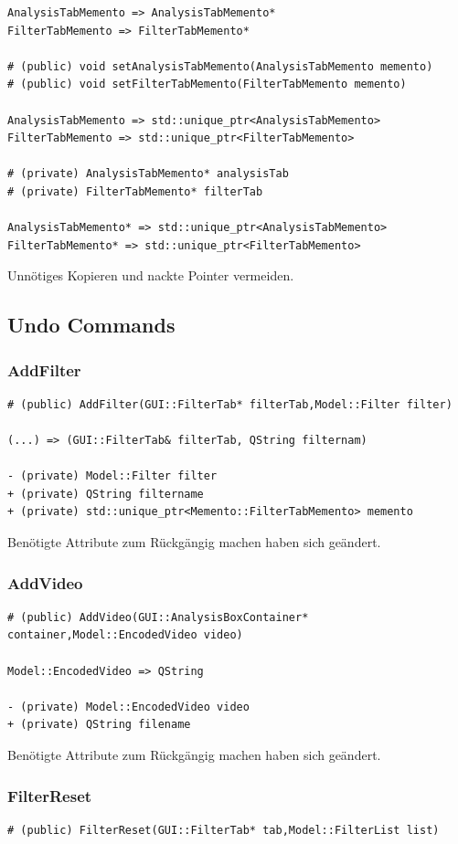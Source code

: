 \documentclass{scrartcl}
\begin{document}
{\begin{verbatim}
AnalysisTabMemento => AnalysisTabMemento*
FilterTabMemento => FilterTabMemento*

# (public) void setAnalysisTabMemento(AnalysisTabMemento memento)
# (public) void setFilterTabMemento(FilterTabMemento memento)

AnalysisTabMemento => std::unique_ptr<AnalysisTabMemento>
FilterTabMemento => std::unique_ptr<FilterTabMemento>

# (private) AnalysisTabMemento* analysisTab
# (private) FilterTabMemento* filterTab

AnalysisTabMemento* => std::unique_ptr<AnalysisTabMemento>
FilterTabMemento* => std::unique_ptr<FilterTabMemento>
\end{verbatim}
Unnötiges Kopieren und nackte Pointer vermeiden.
\newpage
\subsection{Undo Commands}
\subsubsection{AddFilter}
\begin{verbatim}
# (public) AddFilter(GUI::FilterTab* filterTab,Model::Filter filter)

(...) => (GUI::FilterTab& filterTab, QString filternam)

- (private) Model::Filter filter
+ (private) QString filtername
+ (private) std::unique_ptr<Memento::FilterTabMemento> memento
\end{verbatim}
Benötigte Attribute zum Rückgängig machen haben sich geändert.
\bigskip
\subsubsection{AddVideo}
\begin{verbatim}
# (public) AddVideo(GUI::AnalysisBoxContainer* container,Model::EncodedVideo video)

Model::EncodedVideo => QString

- (private) Model::EncodedVideo video
+ (private) QString filename
\end{verbatim}
Benötigte Attribute zum Rückgängig machen haben sich geändert.
\bigskip
\subsubsection{FilterReset}
\begin{verbatim}
# (public) FilterReset(GUI::FilterTab* tab,Model::FilterList list)


\end{verbatim}}
\end{document}
